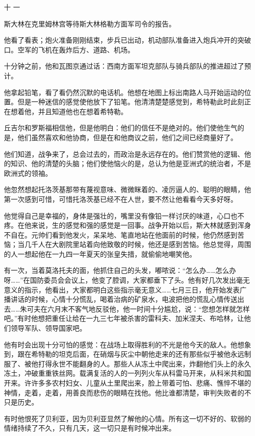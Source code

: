 十 一

斯大林在克里姆林宫等待斯大林格勒方面军司令的报告。

他看了看表；炮火准备刚刚结束，步兵已出动，机动部队准备进入炮兵冲开的突破口。空军的飞机在轰炸后方、道路、机场。

十分钟之前，他和瓦图京通过话：西南方面军坦克部队与骑兵部队的推进超过了预计。

他拿起铅笔，看了看仍然沉默的电话机。他想在地图上标出南路人马开始运动的位置。但是一种迷信的感觉使他放下了铅笔。他清清楚楚感觉到，希特勒此时此刻正在想着他，并且知道他也在想着希特勒。

丘吉尔和罗斯福相信他，但是他明白：他们的信任不是绝对的。他们使他生气的是，他们虽然喜欢和他协商，但是在和他商议之前，他们之间已经商量好了。

他们知道，战争来了，总会过去的，而政治是永远存在的。他们赞赏他的逻辑、他的知识、他的清楚的头脑；他们使他恼火的是，总认为他是亚洲式的统治者，不是欧洲式的领袖。

他忽然想起托洛茨基那带有蔑视意味、微微眯着的、凌厉逼人的、聪明的眼睛，他第一次感到可惜，可惜托洛茨基已经不在人世，要不然让他看看今天多好呀。

他觉得自己是幸福的，身体是强壮的，嘴里没有像铅一样讨厌的味道，心口也不疼。在他来说，生的感觉和强的感觉是一回事。战争开始以后，斯大林就感到浑身不自在。元帅们看到他发火，呆呆地、笔直地站在他面前的时候，他仍然感到苦恼；当几千人在大剧院里站着向他致敬的时候，他还是感到苦恼。他总觉得，周围的人一想起他在一九四一年夏天的张皇失措，就偷偷地嘲笑他。

有一次，当着莫洛托夫的面，他抓住自己的头发，嘟哝说：“怎么办……怎么办呀……”在国防委员会会议上，他变了腔调，大家都垂下了头。他有好几次发出毫无意义的指示，他看出，大家都明白这些指示毫无意义……七月三日，他开始发表广播讲话的时候，心情十分慌乱，喝着治病的矿泉水，电波把他的慌乱心情传送出去……朱可夫在六月末不客气地反驳他，他一时间十分尴尬，说：“您想怎样就怎样吧。”有时他想把重任让给在一九三七年被杀害的雷科夫、加米涅夫、布哈林，让他们领导军队、领导国家吧。

他有时会出现十分可怕的感觉：在战场上取得胜利的不光是他今天的敌人。他想象到，跟在希特勒的坦克后面，在硝烟与灰尘中朝他走来的还有那些似乎被他永远制服了、被他打得永世不能翻身的人。那些人从冻土中爬出来，炸翻他们头上的永久冻土，冲破重重铁丝网。载满复活的人的一列列火车从科雷马开来，从科米共和国开来。许许多多农村妇女、儿童从土里爬出来，脸上带着可怕、悲痛、憔悴不堪的神情，走着，走着，用善良而悲伤的眼睛在找他。他比谁都清楚，审判失败者的不只是历史。

有时他恨死了贝利亚，因为贝利亚显然了解他的心情。所有这一切不好的、软弱的情绪持续了不久，只有几天，这一切只是有时候冲出来。

